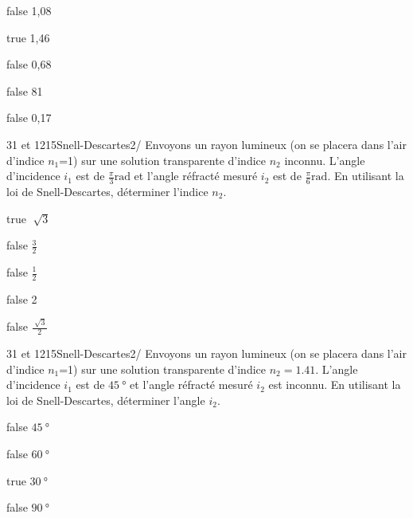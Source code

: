             \begin{reponses}
            	\item[false] 1,08
            	\item[true]  1,46
                \item[false] 0,68
                \item[false] 81
                \item[false] 0,17
            \end{reponses}
            \begin{question}{31 et 1215}{Snell-Descartes}{2}{/}
				Envoyons un rayon lumineux (on se placera dans l'air d'indice $n_1$=1) sur une solution transparente d'indice $n_2$ inconnu. L'angle d'incidence $i_1$ est de $\frac{\pi}{3} \si\radian$ et l'angle réfracté mesuré $i_2$ est de $\frac{\pi}{6} \si\radian$. En utilisant la loi de Snell-Descartes, déterminer l'indice $n_2$.
            \end{question}
            \begin{reponses}
            	\item[true] $\sqrt[]{3}$ 
            	\item[false] $\frac{3}{2}$
                \item[false] $\frac{1}{2}$
                \item[false] 2
                 \item[false] $\frac{\sqrt[]{3}}{2}$
            \end{reponses}
            \begin{question}{31 et 1215}{Snell-Descartes}{2}{/}
				Envoyons un rayon lumineux (on se placera dans l'air d'indice $n_1$=1) sur une solution transparente d'indice $n_2=1.41$. L'angle d'incidence $i_1$ est de $\SI{45}{\degree}$ et l'angle réfracté mesuré $i_2$ est inconnu. En utilisant la loi de Snell-Descartes, déterminer l'angle $i_2$.
            \end{question}
            \begin{reponses}
            	\item[false]$\SI{45}{\degree}$
            	\item[false] $\SI{60}{\degree}$
                \item[true] $\SI{30}{\degree}$
                \item[false] $\SI{90}{\degree}$
            \end{reponses}
